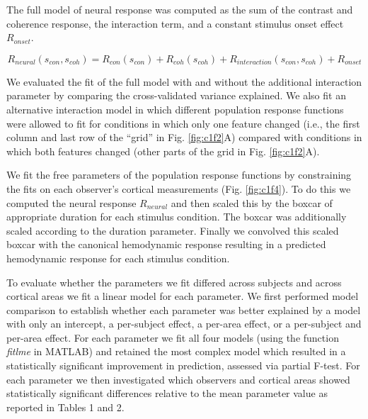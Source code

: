 \documentclass{report}
\begin{document}
The full model of neural response was computed as the sum of the contrast and coherence response, the interaction term, and a constant stimulus onset effect $R_{onset}$.

\begin{equation}
    R_{neural}(s_{con},s_{coh})=R_{con}(s_{con})+R_{coh}(s_{coh})+R_{interaction}(s_{con},s_{coh})+R_{onset}
\end{equation}

We evaluated the fit of the full model with and without the additional interaction parameter by comparing the cross-validated variance explained. We also fit an alternative interaction model in which different population response functions were allowed to fit for conditions in which only one feature changed (i.e., the first column and last row of the “grid” in Fig. \ref{fig:c1f2}A) compared with conditions in which both features changed (other parts of the grid in Fig. \ref{fig:c1f2}A).

We fit the free parameters of the population response functions by constraining the fits on each observer’s cortical measurements (Fig. \ref{fig:c1f4}). To do this we computed the neural response $R_{neural}$ and then scaled this by the boxcar of appropriate duration for each stimulus condition. The boxcar was additionally scaled according to the duration parameter. Finally we convolved this scaled boxcar with the canonical hemodynamic response resulting in a predicted hemodynamic response for each stimulus condition.

To evaluate whether the parameters we fit differed across subjects and across cortical areas we fit a linear model for each parameter. We first performed model comparison to establish whether each parameter was better explained by a model with only an intercept, a per-subject effect, a per-area effect, or a per-subject and per-area effect. For each parameter we fit all four models (using the function \textit{fitlme} in MATLAB) and retained the most complex model which resulted in a statistically significant improvement in prediction, assessed via partial F-test. For each parameter we then investigated which observers and cortical areas showed statistically significant differences relative to the mean parameter value as reported in Tables 1 and 2.
\end{document}
